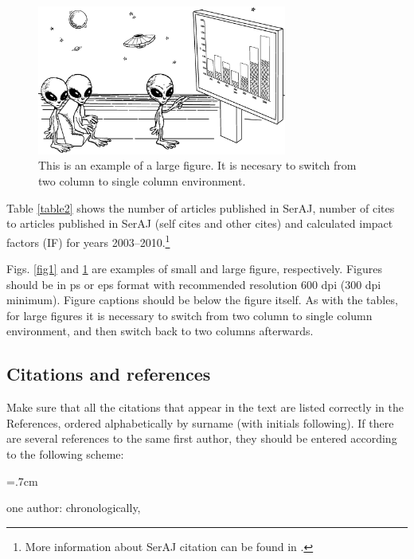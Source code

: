 \documentclass{article_saj}
\begin{document}

\begin{figure}[ht!]
\centerline{\includegraphics[width=0.73\textwidth, keepaspectratio]{fig2.eps}}
\caption{This is an example of a large figure. It is
necesary to switch from two column to single column environment.}
\label{fig2}
\end{figure}

Table \ref{table2} shows the number of articles published in SerAJ, number of
cites to articles published in SerAJ (self cites and other cites)
and calculated impact factors (IF) for years
2003--2010.\footnote{More information about SerAJ citation can be
found in \citet{2007Arb,2010Arb,2013Arb}.}

Figs. \ref{fig1} and \ref{fig2} are examples of small and large figure,
respectively. Figures should be in ps or eps format with
recommended resolution 600 dpi (300 dpi minimum). Figure captions should be
below the figure itself. As with the tables, for large figures it
is necessary to switch from two column to single column
environment, and then switch back to two columns afterwards.


\subsection{Citations and references}

\indent

Make sure that all the citations that appear in the text are listed
correctly in the References, ordered alphabetically by surname
(with initials following). If there are several references to the
same first author, they should be entered according to the
following scheme:

\parindent=.7cm

\par\hang{} one author: chronologically,
\end{document}

